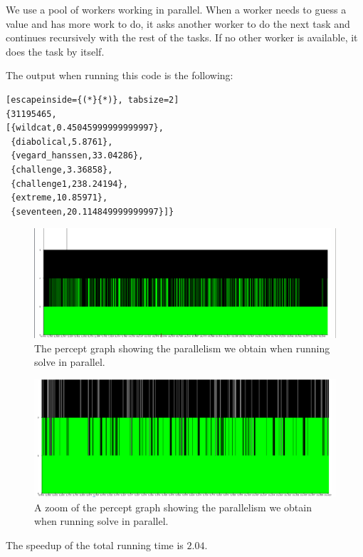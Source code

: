 \documentclass[a4paper]{article}
\begin{document}
We use a pool of workers working in parallel. When a worker needs to guess a value and has more work to do, it asks another worker to do the next task and continues recursively with the rest of the tasks. If no other worker is available, it does the task by itself.

The output when running this code is the following:
\begin{lstlisting}[escapeinside={(*}{*)}, tabsize=2]
{31195465,
[{wildcat,0.45045999999999997},
 {diabolical,5.8761},
 {vegard_hanssen,33.04286},
 {challenge,3.36858},
 {challenge1,238.24194},
 {extreme,10.85971},
 {seventeen,20.114849999999997}]}
\end{lstlisting}

\begin{figure}[!htb]
\begin{center}
\includegraphics[scale=0.2]{Speculative_2_workers}
\caption{The percept graph showing the parallelism we obtain when running solve in parallel.}
\label{fig:solpar}
\end{center}
\end{figure}
\begin{figure}[!htb]
\begin{center}
\includegraphics[scale=0.2]{Speculative_2_workers_zoom}
\caption{A zoom of the percept graph showing the parallelism we obtain when running solve in parallel.}
\label{fig:solparzoom}
\end{center}
\end{figure}

The speedup of the total running time is $2.04$.
\end{document}
